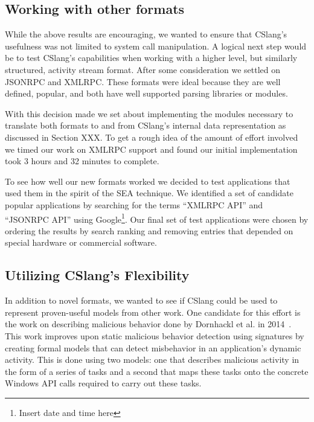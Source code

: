 \subsection{Working with other formats}

While the above results are encouraging, we wanted to ensure that CSlang's
usefulness was not limited to system call manipulation.
A logical next step would be to test CSlang's capabilities when working
with a higher level, but similarly structured, activity stream format.
After some consideration we settled on JSONRPC and XMLRPC.  These formats
were ideal because they are well defined, popular, and both have well
supported parsing libraries or modules.

With this decision made we set about implementing the modules necessary
to translate
both formats to and from CSlang's internal data representation as
discussed in Section XXX.  To get a rough idea of the amount of effort
involved we timed our work on XMLRPC support and found our initial
implementation took 3 hours and 32 minutes to complete.

To see how well our new formats worked we decided to test applications that
used them in the spirit of the SEA technique.  We identified a set of
candidate popular applications by searching for the terms ``XMLRPC API''
and ``JSONRPC API'' using Google\footnote{Insert date and time here}.  Our
final set of test applications were chosen by ordering the results by search
ranking and removing entries that depended on special hardware or
commercial software.


\subsection{Utilizing CSlang's Flexibility}
In addition to novel formats, we wanted to see if CSlang could be used to
represent proven-useful models from other work.  One candidate for this
effort is the work on describing malicious behavior done by Dornhackl et
al. in 2014~\cite{Dornhackl2014}.  This work improves upon static malicious
behavior detection using signatures by creating formal models that can
detect misbehavior in an application's dynamic activity.  This is done
using two models: one that describes malicious activity in the form of a
series of tasks and a second that maps these tasks onto the concrete
Windows API calls required to carry out these tasks.

